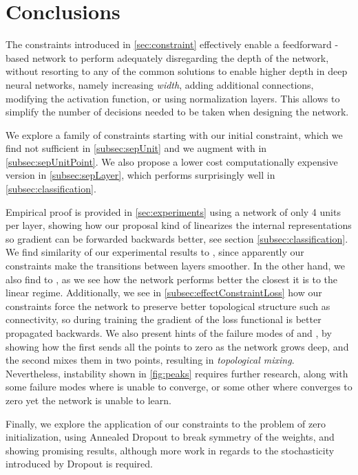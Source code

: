 \section{Conclusions}\label{sec:conclusions}

The constraints introduced in \ref{sec:constraint} effectively enable a feedforward \ReLU-based network to perform adequately disregarding the depth of the network, without resorting to any of the common solutions to enable higher depth in deep neural networks, namely increasing \emph{width}, adding additional connections, modifying the activation function, or using normalization layers. This allows to simplify the number of decisions needed to be taken when designing the network.

We explore a family of constraints starting with our initial \SepUnit constraint, which we find not sufficient in \ref{subsec:sepUnit} and we augment with \SepPoint in \ref{subsec:sepUnitPoint}. We also propose a lower cost computationally expensive version \SepLayer in \ref{subsec:sepLayer}, which performs surprisingly well in \ref{subsec:classification}.

Empirical proof is provided in \ref{sec:experiments} using a network of only 4 units per layer, showing how our proposal kind of linearizes the internal representations so gradient can be forwarded backwards better, see section \ref{subsec:classification}. We find similarity of our experimental results to \cite{hauserAsok}, since apparently our
constraints make the transitions between layers smoother. In the other hand, we also find to \cite{batchnormGradientExplosion}, as we see how the network performs better the closest it is to the linear regime. Additionally, we see in \ref{subsec:effectConstraintLoss} how our constraints force the network to preserve better topological structure such as connectivity, so during training the gradient of the loss functional is better propagated backwards. We also present hints of the failure modes of \ReLU and \ReLUBN, by showing how the first sends all the points to zero as the network grows deep, and the second mixes them in two points, resulting in \emph{topological mixing}. Nevertheless, instability shown in \ref{fig:peaks} requires further research, along with some failure modes where \SepUnitPoint is unable to converge, or some other where \SepLayer converges to zero yet the network is unable to learn.

Finally, we explore the application of our constraints to the problem of zero initialization, using Annealed Dropout to break symmetry of the weights, and showing promising results, although more work in regards to the stochasticity introduced by Dropout is required.
